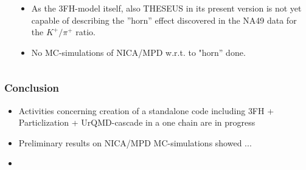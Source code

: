 \documentclass[dvipsnames] {beamer}
\begin{document}
\begin{frame}
\begin{columns}[c]
\begin{block}{}
   \end{block}
   \begin{block}{}
     \bf
     \begin{itemize}
     \item {\color {blue} As the 3FH-model itself,
       also THESEUS in its present version is not
       yet capable of describing the ”horn” effect discovered in
       the NA49 data for the $K^{+} / \pi^{+}$ ratio.}
     \item {\color {red} No MC-simulations of NICA/MPD w.r.t. to "horn'' done.}
     \end{itemize}
   \end{block}
   \end{columns}
\end{frame}





\begin{frame}
  \bf
  \frametitle{Conclusion}
  \begin{itemize}
  \item Activities concerning creation of a standalone code including {\color {red} 3FH + Particlization + UrQMD-cascade} in a one chain are in progress  
  \item Preliminary results on NICA/MPD MC-simulations showed ...
  \item
  \end{itemize}
  
    

\end{frame}
\end{document}
